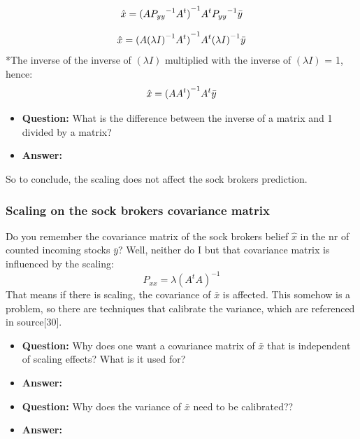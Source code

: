 \begin{equation}
    \hat{x}={(A{P_{yy}}^{-1}A^t)}^{-1}{A^t{P_{yy}}^{-1}\Bar{y}}
    \label{eq:insider_broker_solution}
\end{equation}

\begin{equation}
    \hat{x}={(A{(\lambda I)}^{-1}A^t)}^{-1}{A^t{(\lambda I)}^{-1}\Bar{y}}
    \label{eq:insider_broker_solution}
\end{equation}
*The inverse of the inverse of $(\lambda I)$ multiplied with the inverse of $(\lambda I)$ = 1, hence:
\begin{equation}
    \hat{x}={(AA^t)}^{-1}{A^t\Bar{y}}
    \label{eq:insider_broker_solution}
\end{equation}

\begin{itemize}
    \item \textbf{Question:} What is the difference between the inverse of a matrix and 1 divided by a matrix?
    \item \textbf{Answer:}
\end{itemize}
 So to conclude, the scaling does not affect the sock brokers prediction.
\subsubsection{Scaling on the sock brokers covariance matrix}
Do you remember the covariance matrix of the sock brokers belief $\hat{x}$ in the nr of counted incoming stocks $\bar{y}$? Well, neither do I but that covariance matrix is influenced by the scaling:
\begin{equation}
    P_{xx}=\lambda{(A^tA)}^{-1}
\end{equation}
That means if there is scaling, the covariance of $\bar{x}$ is affected. This somehow is a problem, so there are techniques that calibrate the variance, which are referenced in source[30].

\begin{itemize}
    \item \textbf{Question:} Why does one want a covariance matrix of $\bar{x}$ that is independent of scaling effects? What is it used for?
    \item \textbf{Answer:}
\end{itemize}


\begin{itemize}
    \item \textbf{Question:} Why does the variance of $\bar{x}$ need to be calibrated??
    \item \textbf{Answer:}
\end{itemize}

